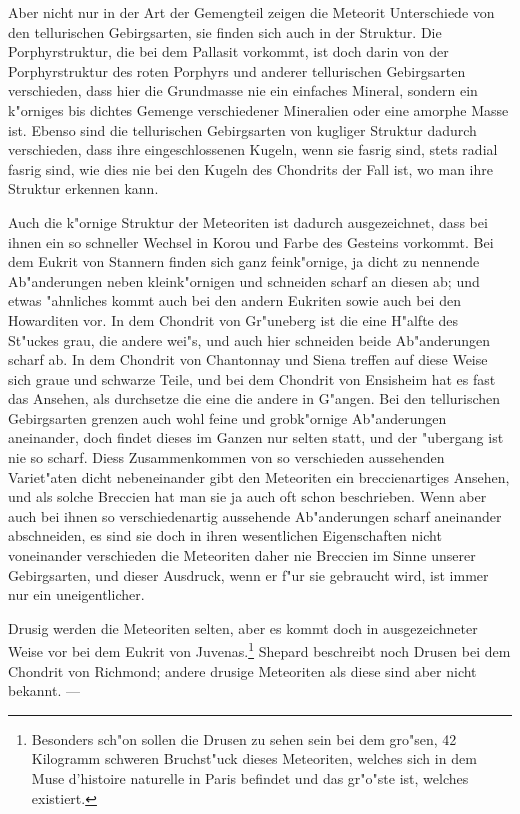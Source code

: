 \documentclass[a4paper, 11pt, oneside, german]{article}
\begin{document}
Aber nicht nur in der Art der Gemengteil zeigen die Meteorit Unterschiede von den tellurischen Gebirgsarten, sie finden sich auch in der Struktur. Die Porphyrstruktur, die bei dem Pallasit vorkommt, ist doch darin von der Porphyrstruktur des roten Porphyrs und anderer tellurischen Gebirgsarten verschieden, dass hier die Grundmasse nie ein einfaches Mineral, sondern ein k"orniges bis dichtes Gemenge verschiedener Mineralien oder eine amorphe Masse ist. Ebenso sind die tellurischen Gebirgsarten von kugliger Struktur dadurch verschieden, dass ihre eingeschlossenen Kugeln, wenn sie fasrig sind, stets radial fasrig sind, wie dies nie bei den Kugeln des Chondrits der Fall ist, wo man ihre Struktur erkennen kann.

Auch die k"ornige Struktur der Meteoriten ist dadurch ausgezeichnet, dass bei ihnen ein so schneller Wechsel in Korou und Farbe des Gesteins vorkommt. Bei dem Eukrit von Stannern finden sich ganz feink"ornige, ja dicht zu nennende Ab"anderungen neben kleink"ornigen und schneiden scharf an diesen ab; und etwas "ahnliches kommt auch bei den andern Eukriten sowie auch bei den Howarditen vor. In dem Chondrit von Gr"uneberg ist die eine H"alfte des St"uckes grau, die andere wei"s, und auch hier schneiden beide Ab"anderungen scharf ab. In dem Chondrit von Chantonnay und Siena treffen auf diese Weise sich graue und schwarze Teile, und bei dem Chondrit von Ensisheim hat es fast das Ansehen, als durchsetze die eine die andere in G"angen. Bei den tellurischen Gebirgsarten grenzen auch wohl feine und grobk"ornige Ab"anderungen aneinander, doch findet dieses im Ganzen nur selten statt, und der "ubergang ist nie so scharf. Diess Zusammenkommen von so verschieden aussehenden Variet"aten dicht nebeneinander gibt den Meteoriten ein breccienartiges Ansehen, und als solche Breccien hat man sie ja auch oft schon beschrieben. Wenn aber auch bei ihnen so verschiedenartig aussehende Ab"anderungen scharf aneinander abschneiden, es sind sie doch in ihren wesentlichen Eigenschaften nicht voneinander verschieden die Meteoriten daher nie Breccien im Sinne unserer Gebirgsarten, und dieser Ausdruck, wenn er f"ur sie gebraucht wird, ist immer nur ein uneigentlicher.

Drusig werden die Meteoriten selten, aber es kommt doch in ausgezeichneter Weise vor bei dem Eukrit von Juvenas.\footnote{Besonders sch"on sollen die Drusen zu sehen sein bei dem gro"sen, 42 Kilogramm schweren Bruchst"uck dieses Meteoriten, welches sich in dem Muse d'histoire naturelle in Paris befindet und das gr"o"ste ist, welches existiert.} Shepard beschreibt noch Drusen bei dem Chondrit von Richmond; andere drusige Meteoriten als diese sind aber nicht bekannt. ---
\end{document}
